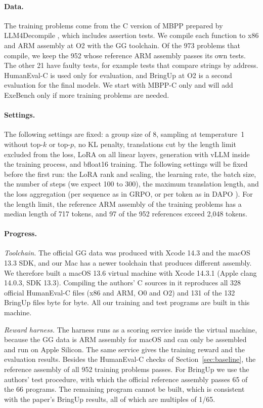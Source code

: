 \documentclass{article}
\begin{document}
\paragraph{Data.}
The training problems come from the C version of MBPP \citep{mbpp} prepared by LLM4Decompile \citep{llm4decompile}, which includes assertion tests. We compile each function to x86 and ARM assembly at O2 with the GG toolchain. Of the 973 problems that compile, we keep the 952 whose reference ARM assembly passes its own tests. The other 21 have faulty tests, for example tests that compare strings by address. HumanEval-C is used only for evaluation, and BringUp at O2 is a second evaluation for the final models. We start with MBPP-C only and will add ExeBench only if more training problems are needed.

\paragraph{Settings.}
The following settings are fixed: a group size of 8, sampling at temperature~1 without top-$k$ or top-$p$, no KL penalty, translations cut by the length limit excluded from the loss, LoRA on all linear layers, generation with vLLM \citep{vllm} inside the training process, and bfloat16 training. The following settings will be fixed before the first run: the LoRA rank and scaling, the learning rate, the batch size, the number of steps (we expect 100 to 300), the maximum translation length, and the loss aggregation (per sequence as in GRPO, or per token as in DAPO \citep{dapo}). For the length limit, the reference ARM assembly of the training problems has a median length of 717 tokens, and 97 of the 952 references exceed 2{,}048 tokens.

\paragraph{Progress.}
\emph{Toolchain.} The official GG data was produced with Xcode 14.3 and the macOS 13.3 SDK, and our Mac has a newer toolchain that produces different assembly. We therefore built a macOS 13.6 virtual machine with Xcode 14.3.1 (Apple clang 14.0.3, SDK 13.3). Compiling the authors' C sources in it reproduces all 328 official HumanEval-C files (x86 and ARM, O0 and O2) and 131 of the 132 BringUp files byte for byte. All our training and test programs are built in this machine.

\emph{Reward harness.} The harness runs as a scoring service inside the virtual machine, because the GG data is ARM assembly for macOS and can only be assembled and run on Apple Silicon. The same service gives the training reward and the evaluation results. Besides the HumanEval-C checks of Section~\ref{sec:baseline}, the reference assembly of all 952 training problems passes. For BringUp we use the authors' test procedure, with which the official reference assembly passes 65 of the 66 programs. The remaining program cannot be built, which is consistent with the paper's BringUp results, all of which are multiples of 1/65.
\end{document}
